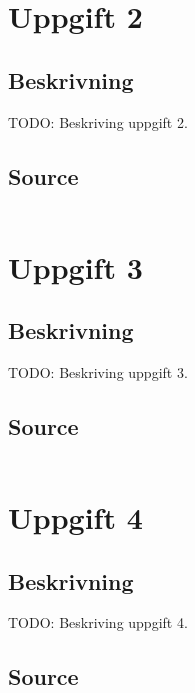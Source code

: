 \documentclass[11pt,a4paper]{article}
\begin{document}
\section{Uppgift 2}\label{uppgift-2}

\subsection{Beskrivning}
TODO: Beskriving uppgift 2.

\subsection{Source}\label{uppgift-2_src}
\inputminted[]{java}{../src/Lab1Uppg02.java}

\section{Uppgift 3}\label{uppgift-3}

\subsection{Beskrivning}
TODO: Beskriving uppgift 3.

\subsection{Source}\label{uppgift-3_src}
\inputminted[]{java}{../src/Lab1Uppg03.java}


\section{Uppgift 4}\label{uppgift-4}

\subsection{Beskrivning}
TODO: Beskriving uppgift 4.

\subsection{Source}\label{uppgift-4_src}
\inputminted[]{java}{../src/Lab1Uppg04.java}

\end{document}
